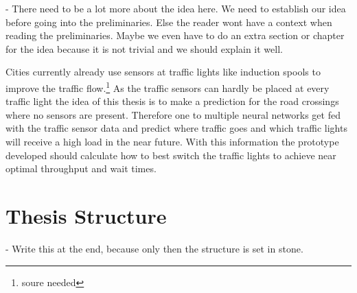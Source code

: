 

- There need to be a lot more about the idea here. We need to establish our idea before going into the preliminaries. Else the reader wont have a context when reading the preliminaries. Maybe we even have to do an extra section or chapter for the idea because it is not trivial and we should explain it well.

Cities currently already use sensors at traffic lights like induction spools to improve the traffic flow.\footnote{soure needed} As the traffic sensors can hardly be placed at every traffic light the idea of this thesis is to make a prediction for the road crossings where no sensors are present. Therefore one to multiple neural networks get fed with the traffic sensor data and predict where traffic goes and which traffic lights will receive a high load in the near future. With this information the prototype developed should calculate how to best switch the traffic lights to achieve near optimal throughput and wait times.

\section{Thesis Structure}

- Write this at the end, because only then the structure is set in stone.